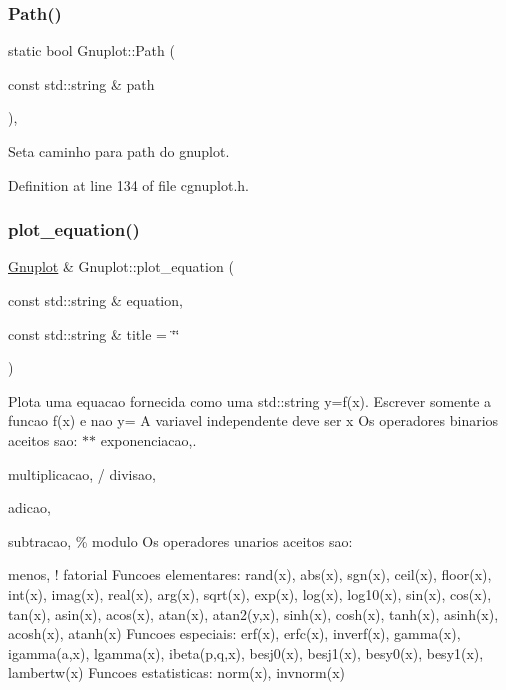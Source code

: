 \subsubsection{\texorpdfstring{Path()}{Path()}}
{\footnotesize\ttfamily static bool Gnuplot\+::\+Path (\begin{DoxyParamCaption}\item[{const std\+::string \&}]{path }\end{DoxyParamCaption})\hspace{0.3cm}{\ttfamily [inline]}, {\ttfamily [static]}}



Seta caminho para path do gnuplot. 



Definition at line 134 of file cgnuplot.\+h.

\mbox{\label{class_gnuplot_a42dfb8c9d4636745c7be277ed818e849}} 
\subsubsection{\texorpdfstring{plot\+\_\+equation()}{plot\_equation()}}
{\footnotesize\ttfamily \hyperlink{class_gnuplot}{Gnuplot} \& Gnuplot\+::plot\+\_\+equation (\begin{DoxyParamCaption}\item[{const std\+::string \&}]{equation,  }\item[{const std\+::string \&}]{title = {\ttfamily \char`\"{}\char`\"{}} }\end{DoxyParamCaption})}



Plota uma equacao fornecida como uma std\+::string y=f(x). Escrever somente a funcao f(x) e nao y= A variavel independente deve ser x Os operadores binarios aceitos sao\+: $\ast$$\ast$ exponenciacao,. 


\begin{DoxyItemize}
\item multiplicacao, / divisao,
\end{DoxyItemize}

adicao,
\begin{DoxyItemize}
\item subtracao, \% modulo Os operadores unarios aceitos sao\+:
\item menos, ! fatorial Funcoes elementares\+: rand(x), abs(x), sgn(x), ceil(x), floor(x), int(x), imag(x), real(x), arg(x), sqrt(x), exp(x), log(x), log10(x), sin(x), cos(x), tan(x), asin(x), acos(x), atan(x), atan2(y,x), sinh(x), cosh(x), tanh(x), asinh(x), acosh(x), atanh(x) Funcoes especiais\+: erf(x), erfc(x), inverf(x), gamma(x), igamma(a,x), lgamma(x), ibeta(p,q,x), besj0(x), besj1(x), besy0(x), besy1(x), lambertw(x) Funcoes estatisticas\+: norm(x), invnorm(x) 
\end{DoxyItemize}

